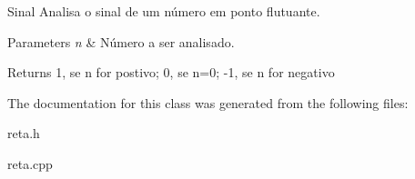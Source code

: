 Sinal Analisa o sinal de um número em ponto flutuante. 


\begin{DoxyParams}{Parameters}
{\em n} & Número a ser analisado. \\
\hline
\end{DoxyParams}
\begin{DoxyReturn}{Returns}
1, se n for postivo; 0, se n=0; -\/1, se n for negativo 
\end{DoxyReturn}


The documentation for this class was generated from the following files\+:\begin{DoxyCompactItemize}
\item 
reta.\+h\item 
reta.\+cpp\end{DoxyCompactItemize}

